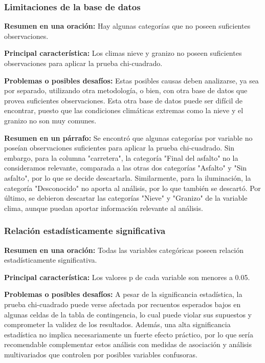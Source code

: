 \documentclass{book}
\begin{document}
\subsubsection{Limitaciones de la base de datos}
\textbf{Resumen en una oración:} Hay algunas categorías que no poseen suficientes observaciones.

\textbf{Principal característica:} Los climas nieve y granizo no poseen suficientes observaciones para aplicar la prueba chi-cuadrado.

\textbf{Problemas o posibles desafíos:} Estas posibles causas deben analizarse, ya sea por separado, utilizando otra metodología, o bien, con otra base de datos que provea suficientes observaciones. Esta otra base de datos puede ser difícil de encontrar, puesto que las condiciones climáticas extremas como la nieve y el granizo no son muy comunes.

\textbf{Resumen en un párrafo:} Se encontró que algunas categorías por variable no poseían observaciones suficientes para aplicar la prueba chi-cuadrado. Sin embargo, para la columna "carretera", la categoría "Final del asfalto" no la consideramos relevante, comparada a las otras dos categorías "Asfalto" y "Sin asfalto", por lo que se decide descartarla. Similarmente, para la iluminación, la categoría "Desconocido" no aporta al análisis, por lo que también se descartó. Por último, se debieron descartar las categorías "Nieve" y "Granizo" de la variable clima, aunque puedan aportar información relevante al análisis.


\subsubsection{Relación estadísticamente significativa}
\textbf{Resumen en una oración:} Todas las variables categóricas poseen relación estadísticamente significativa.

\textbf{Principal característica:} Los valores p de cada variable son menores a 0.05.

\textbf{Problemas o posibles desafíos:} A pesar de la significancia estadística, la prueba chi-cuadrado puede verse afectada por recuentos esperados bajos en algunas celdas de la tabla de contingencia, lo cual puede violar sus supuestos y comprometer la validez de los resultados. Además, una alta significancia estadística no implica necesariamente un fuerte efecto práctico, por lo que sería recomendable complementar estos análisis con medidas de asociación y análisis multivariados que controlen por posibles variables confusoras.
\end{document}

